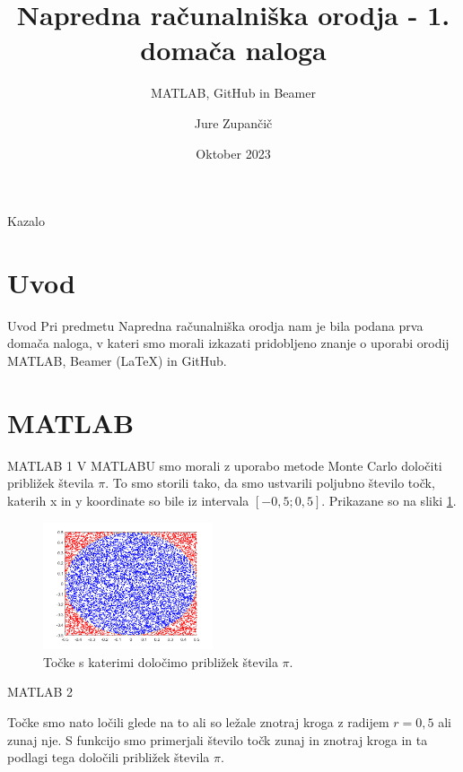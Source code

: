 \documentclass{beamer}
\title{Napredna računalniška orodja - 1. domača naloga}
\subtitle{MATLAB, GitHub in Beamer }
\author{Jure Zupančič }
\date{Oktober 2023}
\begin{document}
\maketitle

\begin{frame}{Kazalo}
    \tableofcontents[]
\end{frame}

\section{Uvod}

\begin{frame}{Uvod}
    Pri predmetu Napredna računalniška orodja nam je bila podana prva domača naloga, v kateri smo morali izkazati pridobljeno znanje o uporabi orodij MATLAB, Beamer (LaTeX) in GitHub.

\end{frame}


\section{MATLAB}
\begin{frame}{MATLAB 1}
    V MATLABU smo morali z uporabo metode Monte Carlo določiti približek števila $\pi$. To smo storili tako, da smo ustvarili poljubno število točk, katerih x in y koordinate so bile iz intervala $[-0,5 ; 0,5]$. Prikazane so na sliki \ref{fig:enter-label}.

    \pause
    
    \begin{figure}
        \centering
        \includegraphics[width=5cm]{točke.png}
        \caption{Točke s katerimi določimo približek števila $\pi$.}
        \label{fig:enter-label}
    \end{figure}
\end{frame}

\begin{frame}{MATLAB 2}
    
    Točke smo nato ločili glede na to ali so ležale znotraj kroga z radijem $r=0,5$ ali zunaj nje.
    S funkcijo smo primerjali število točk zunaj in znotraj kroga in ta podlagi tega določili približek števila $\pi$.
\end{frame}
\end{document}
